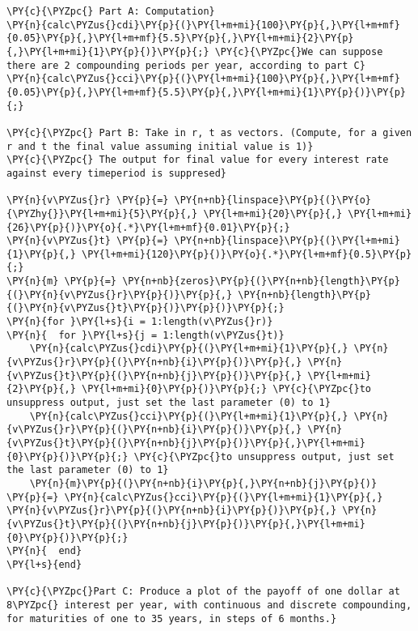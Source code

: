 \begin{Verbatim}[commandchars=\\\{\}]
\PY{c}{\PYZpc{} Part A: Computation}
\PY{n}{calc\PYZus{}cdi}\PY{p}{(}\PY{l+m+mi}{100}\PY{p}{,}\PY{l+m+mf}{0.05}\PY{p}{,}\PY{l+m+mf}{5.5}\PY{p}{,}\PY{l+m+mi}{2}\PY{p}{,}\PY{l+m+mi}{1}\PY{p}{)}\PY{p}{;} \PY{c}{\PYZpc{}We can suppose there are 2 compounding periods per year, according to part C}
\PY{n}{calc\PYZus{}cci}\PY{p}{(}\PY{l+m+mi}{100}\PY{p}{,}\PY{l+m+mf}{0.05}\PY{p}{,}\PY{l+m+mf}{5.5}\PY{p}{,}\PY{l+m+mi}{1}\PY{p}{)}\PY{p}{;}

\PY{c}{\PYZpc{} Part B: Take in r, t as vectors. (Compute, for a given r and t the final value assuming initial value is 1)}
\PY{c}{\PYZpc{} The output for final value for every interest rate against every timeperiod is suppresed}

\PY{n}{v\PYZus{}r} \PY{p}{=} \PY{n+nb}{linspace}\PY{p}{(}\PY{o}{\PYZhy{}}\PY{l+m+mi}{5}\PY{p}{,} \PY{l+m+mi}{20}\PY{p}{,} \PY{l+m+mi}{26}\PY{p}{)}\PY{o}{.*}\PY{l+m+mf}{0.01}\PY{p}{;}
\PY{n}{v\PYZus{}t} \PY{p}{=} \PY{n+nb}{linspace}\PY{p}{(}\PY{l+m+mi}{1}\PY{p}{,} \PY{l+m+mi}{120}\PY{p}{)}\PY{o}{.*}\PY{l+m+mf}{0.5}\PY{p}{;}
\PY{n}{m} \PY{p}{=} \PY{n+nb}{zeros}\PY{p}{(}\PY{n+nb}{length}\PY{p}{(}\PY{n}{v\PYZus{}r}\PY{p}{)}\PY{p}{,} \PY{n+nb}{length}\PY{p}{(}\PY{n}{v\PYZus{}t}\PY{p}{)}\PY{p}{)}\PY{p}{;}
\PY{n}{for }\PY{l+s}{i = 1:length(v\PYZus{}r)}
\PY{n}{  for }\PY{l+s}{j = 1:length(v\PYZus{}t)}
    \PY{n}{calc\PYZus{}cdi}\PY{p}{(}\PY{l+m+mi}{1}\PY{p}{,} \PY{n}{v\PYZus{}r}\PY{p}{(}\PY{n+nb}{i}\PY{p}{)}\PY{p}{,} \PY{n}{v\PYZus{}t}\PY{p}{(}\PY{n+nb}{j}\PY{p}{)}\PY{p}{,} \PY{l+m+mi}{2}\PY{p}{,} \PY{l+m+mi}{0}\PY{p}{)}\PY{p}{;} \PY{c}{\PYZpc{}to unsuppress output, just set the last parameter (0) to 1}
    \PY{n}{calc\PYZus{}cci}\PY{p}{(}\PY{l+m+mi}{1}\PY{p}{,} \PY{n}{v\PYZus{}r}\PY{p}{(}\PY{n+nb}{i}\PY{p}{)}\PY{p}{,} \PY{n}{v\PYZus{}t}\PY{p}{(}\PY{n+nb}{j}\PY{p}{)}\PY{p}{,}\PY{l+m+mi}{0}\PY{p}{)}\PY{p}{;} \PY{c}{\PYZpc{}to unsuppress output, just set the last parameter (0) to 1}
    \PY{n}{m}\PY{p}{(}\PY{n+nb}{i}\PY{p}{,}\PY{n+nb}{j}\PY{p}{)} \PY{p}{=} \PY{n}{calc\PYZus{}cci}\PY{p}{(}\PY{l+m+mi}{1}\PY{p}{,} \PY{n}{v\PYZus{}r}\PY{p}{(}\PY{n+nb}{i}\PY{p}{)}\PY{p}{,} \PY{n}{v\PYZus{}t}\PY{p}{(}\PY{n+nb}{j}\PY{p}{)}\PY{p}{,}\PY{l+m+mi}{0}\PY{p}{)}\PY{p}{;}
\PY{n}{  end}
\PY{l+s}{end}

\PY{c}{\PYZpc{}Part C: Produce a plot of the payoff of one dollar at 8\PYZpc{} interest per year, with continuous and discrete compounding, for maturities of one to 35 years, in steps of 6 months.}


\end{Verbatim}
